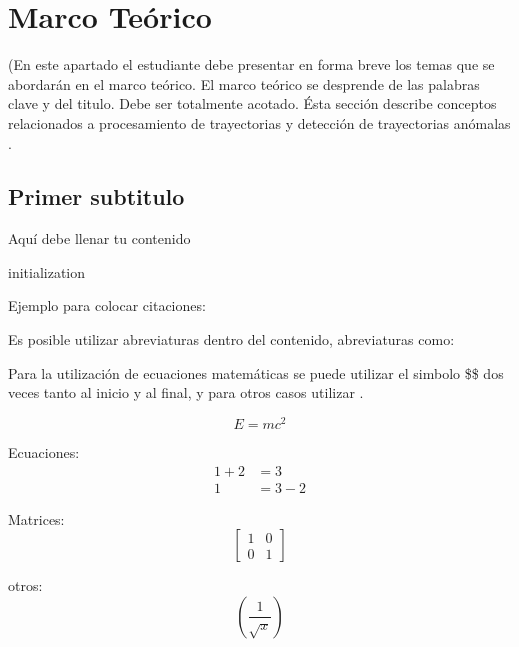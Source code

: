 \chapter{Marco Teórico}
(En este apartado el estudiante debe presentar en forma breve los temas que se abordarán en el marco teórico. El marco teórico se desprende de las palabras clave y del titulo. Debe ser totalmente acotado.
Ésta sección describe conceptos relacionados a procesamiento de trayectorias y detección de trayectorias anómalas .

\section{Primer subtitulo}
Aquí debe llenar tu contenido

\begin{algorithm}[H]
\SetAlgoLined
{}
initialization\;
\nl {}
\caption{Ejemplo de como colocar código en código latex}
\label{IR2}
\end{algorithm}

Ejemplo para colocar citaciones: \cite{sillito2008semi}

Es posible utilizar abreviaturas dentro del contenido, abreviaturas como:

Para la utilización de ecuaciones matemáticas se puede utilizar el simbolo \$\$ dos veces tanto al inicio y al final, y para otros casos utilizar .

$$ E = mc^2 $$

Ecuaciones:
\begin{align*}
  1 + 2 &= 3\\
  1 &= 3 - 2
\end{align*}

Matrices: 
\[\begin{bmatrix}
1 & 0\\
0 & 1
\end{bmatrix}\]

otros:
\begin{equation}
(\frac{1}{\sqrt{x}})
\end{equation}